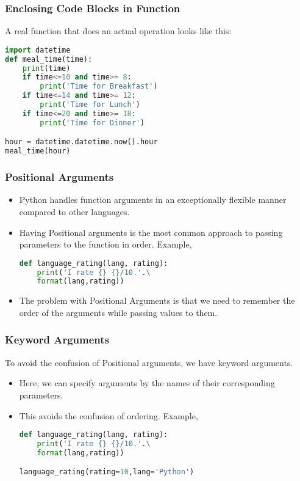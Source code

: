 \documentclass{beamer}
\begin{document}
\begin{frame}[fragile]
\frametitle{Enclosing Code Blocks in Function}
A real function that does an actual operation looks like this:
\begin{lstlisting}[language=Python]
import datetime
def meal_time(time):
    print(time)
    if time<=10 and time>= 8:
        print('Time for Breakfast')
    if time<=14 and time>= 12:
        print('Time for Lunch')
    if time<=20 and time>= 18:
        print('Time for Dinner')

hour = datetime.datetime.now().hour
meal_time(hour)
\end{lstlisting}

\end{frame}

\begin{frame}[fragile]
\frametitle{Positional Arguments}
\begin{itemize}
\item Python handles function arguments in an exceptionally flexible manner compared to other languages.
\item Having Positional arguments is the most common approach to passing parameters to the function in order.
Example,
\begin{lstlisting}[language=Python]
def language_rating(lang, rating):
	print('I rate {} {}/10.'.\
	format(lang,rating))
\end{lstlisting}
\item The problem with Positional Arguments is that we need to remember the order of the arguments while passing values to them.
\end{itemize}
\end{frame}

\begin{frame}[fragile]
\frametitle{Keyword Arguments}
To avoid the confusion of Positional arguments, we have keyword arguments.
\begin{itemize}
\item Here, we can specify arguments by the names of their corresponding parameters.
\item This avoids the confusion of ordering.
Example,
\begin{lstlisting}[language=Python]
def language_rating(lang, rating):
	print('I rate {} {}/10.'.\
	format(lang,rating))

language_rating(rating=10,lang='Python')
\end{lstlisting}
\end{itemize}
\end{frame}
\end{document}
